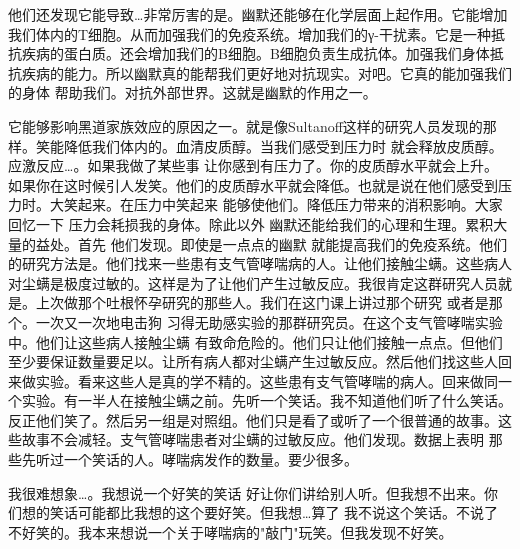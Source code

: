 他们还发现它能导致…非常厉害的是。幽默还能够在化学层面上起作用。它能增加我们体内的T细胞。从而加强我们的免疫系统。增加我们的γ-干扰素。它是一种抵抗疾病的蛋白质。还会增加我们的B细胞。B细胞负责生成抗体。加强我们身体抵抗疾病的能力。所以幽默真的能帮我们更好地对抗现实。对吧。它真的能加强我们的身体 帮助我们。对抗外部世界。这就是幽默的作用之一。 

它能够影响黑道家族效应的原因之一。就是像Sultanoff这样的研究人员发现的那样。笑能降低我们体内的。血清皮质醇。当我们感受到压力时 就会释放皮质醇。应激反应…。如果我做了某些事 让你感到有压力了。你的皮质醇水平就会上升。如果你在这时候引人发笑。他们的皮质醇水平就会降低。也就是说在他们感受到压力时。大笑起来。在压力中笑起来 能够使他们。降低压力带来的消积影响。大家回忆一下 压力会耗损我的身体。除此以外 幽默还能给我们的心理和生理。累积大量的益处。首先 他们发现。即使是一点点的幽默 就能提高我们的免疫系统。他们的研究方法是。他们找来一些患有支气管哮喘病的人。让他们接触尘螨。这些病人对尘螨是极度过敏的。这样是为了让他们产生过敏反应。我很肯定这群研究人员就是。上次做那个吐根怀孕研究的那些人。我们在这门课上讲过那个研究 或者是那个。一次又一次地电击狗 习得无助感实验的那群研究员。在这个支气管哮喘实验中。他们让这些病人接触尘螨 有致命危险的。他们只让他们接触一点点。但他们至少要保证数量要足以。让所有病人都对尘螨产生过敏反应。然后他们找这些人回来做实验。看来这些人是真的学不精的。这些患有支气管哮喘的病人。回来做同一个实验。有一半人在接触尘螨之前。先听一个笑话。我不知道他们听了什么笑话。反正他们笑了。然后另一组是对照组。他们只是看了或听了一个很普通的故事。这些故事不会减轻。支气管哮喘患者对尘螨的过敏反应。他们发现。数据上表明 那些先听过一个笑话的人。哮喘病发作的数量。要少很多。 

我很难想象…。我想说一个好笑的笑话 好让你们讲给别人听。但我想不出来。你们想的笑话可能都比我想的这个要好笑。但我想…算了 我不说这个笑话。不说了 不好笑的。我本来想说一个关于哮喘病的"敲门"玩笑。但我发现不好笑。 

